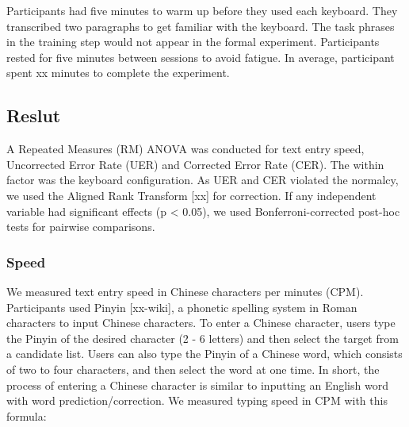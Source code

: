 
Participants had five minutes to warm up before they used each keyboard. They transcribed two paragraphs to get familiar with the keyboard. The task phrases in the training step would not appear in the formal experiment. Participants rested for five minutes between sessions to avoid fatigue. In average, participant spent xx minutes to complete the experiment.


\subsection{Reslut}

A Repeated Measures (RM) ANOVA was conducted for text entry speed, Uncorrected Error Rate (UER) and Corrected Error Rate (CER). The within factor was the keyboard configuration. As UER and CER violated the normalcy, we used the Aligned Rank Transform [xx] for correction. If any independent variable had significant effects (p < 0.05), we used Bonferroni-corrected post-hoc tests for pairwise comparisons.

\subsubsection{Speed}

We measured text entry speed in Chinese characters per minutes (CPM). Participants used Pinyin [xx-wiki], a phonetic spelling system in Roman characters to input Chinese characters. To enter a Chinese character, users type the Pinyin of the desired character (2 - 6 letters) and then select the target from a candidate list. Users can also type the Pinyin of a Chinese word, which consists of two to four characters, and then select the word at one time. In short, the process of entering a Chinese character is similar to inputting an English word with word prediction/correction. We measured typing speed in CPM with this formula:

